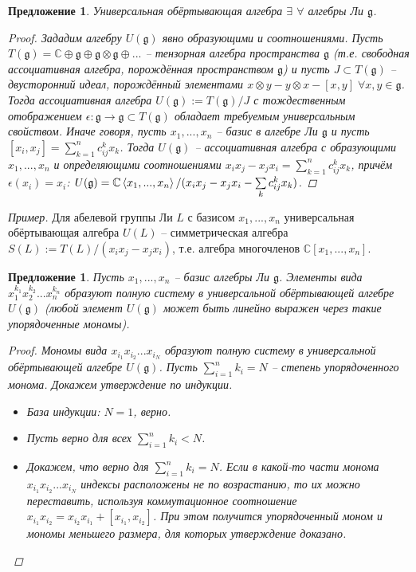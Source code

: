 \documentclass[12pt]{article}
\newtheorem{predl}[theorem]{Предложение}
\theoremstyle{definition}
\begin{document}
\begin{predl}
    Универсальная обёртывающая алгебра $\exists$ $\forall$ алгебры Ли $\mathfrak{g}$.
    \begin{proof}
        Зададим алгебру $U(\mathfrak{g})$ явно образующими и соотношениями. Пусть $T(\mathfrak{g})=\mathbb{C}\oplus \mathfrak{g}\oplus\mathfrak{g}\otimes \mathfrak{g}\oplus...$ -- тензорная алгебра пространства $\mathfrak{g}$ (т.е. свободная ассоциативная алгебра, порождённая пространством $\mathfrak{g}$) и пусть $J\subset T(\mathfrak{g})$ -- двусторонний идеал, порождённый элементами $x\otimes y-y\otimes x-[x,y]\;\forall x,y\in \mathfrak{g}$. Тогда ассоциативная алгебра $U(\mathfrak{g}):=T(\mathfrak{g})/J$ с тождественным отображением $\epsilon:\mathfrak{g}\rightarrow\mathfrak{g}\subset T(\mathfrak{g})$ обладает требуемым универсальным свойством. Иначе говоря, пусть $x_1,...,x_n$ -- базис в алгебре Ли $\mathfrak{g}$ и пусть $[x_i,x_j]=\sum\limits_{k=1}^nc^k_{ij}x_k$. Тогда $U(\mathfrak{g})$ -- ассоциативная алгебра с образующими $x_1,...,x_n$ и определяющими соотношениями $x_ix_j-x_jx_i=\sum\limits_{k=1}^nc^k_{ij}x_k$, причём $\epsilon(x_i)=x_i$: $U(\mathfrak{g})=\mathbb{C}\braket{x_1,...,x_n}/(x_ix_j-x_jx_i-\sum\limits_kc^k_{ij}x_k)$.
    \end{proof}
\end{predl}
\textit{Пример.} Для абелевой группы Ли $L$ с базисом $x_1,...,x_n$ универсальная обёртывающая алгебра $U(L)$ -- симметрическая алгебра $S(L):=T(L)/(x_ix_j-x_jx_i)$, т.е. алгебра многочленов $\mathbb{C}[x_1,...,x_n]$.
\begin{predl}
    Пусть $x_1,...,x_n$ -- базис алгебры Ли $\mathfrak{g}$. Элементы вида $x_1^{k_1}x_2^{k_2}...x_n^{k_n}$ образуют полную систему в универсальной обёртывающей алгебре $U(\mathfrak{g})$ (любой элемент $U(\mathfrak{g})$ может быть линейно выражен через такие упорядоченные мономы).
    \begin{proof}
        Мономы вида $x_{i_1}x_{i_2}...x_{i_N}$ образуют полную систему в универсальной обёртывающей алгебре $U(\mathfrak{g})$. Пусть $\sum\limits_{i=1}^nk_i=N$ -- степень упорядоченного монома. Докажем утверждение по индукции.
        \begin{itemize}
            \item База индукции: $N=1$, верно.
            \item Пусть верно для всех $\sum\limits_{i=1}^nk_i<N$.
            \item Докажем, что верно для $\sum\limits_{i=1}^nk_i=N$. Если в какой-то части монома $x_{i_1}x_{i_2}...x_{i_N}$ индексы расположены не по возрастанию, то их можно переставить, используя коммутационное соотношение $x_{i_1}x_{i_2}=x_{i_2}x_{i_1}+[x_{i_1},x_{i_2}]$. При этом получится упорядоченный моном и мономы меньшего размера, для которых утверждение доказано.
        \end{itemize}
    \end{proof}
\end{predl}
\end{document}
